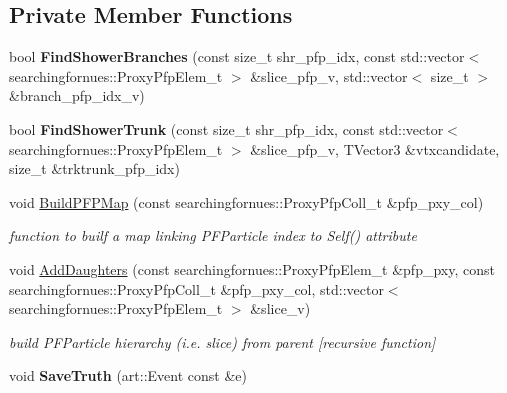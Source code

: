 \subsection*{Private Member Functions}
\begin{DoxyCompactItemize}
\item 
\hypertarget{classShowerMerger_a6fb74d3738dbaf29ebe0257eea8e3c6c}{bool {\bfseries Find\-Shower\-Branches} (const size\-\_\-t shr\-\_\-pfp\-\_\-idx, const std\-::vector$<$ searchingfornues\-::\-Proxy\-Pfp\-Elem\-\_\-t $>$ \&slice\-\_\-pfp\-\_\-v, std\-::vector$<$ size\-\_\-t $>$ \&branch\-\_\-pfp\-\_\-idx\-\_\-v)}\label{classShowerMerger_a6fb74d3738dbaf29ebe0257eea8e3c6c}

\item 
\hypertarget{classShowerMerger_a559f4ef0334813f609ce0038fc5b273c}{bool {\bfseries Find\-Shower\-Trunk} (const size\-\_\-t shr\-\_\-pfp\-\_\-idx, const std\-::vector$<$ searchingfornues\-::\-Proxy\-Pfp\-Elem\-\_\-t $>$ \&slice\-\_\-pfp\-\_\-v, T\-Vector3 \&vtxcandidate, size\-\_\-t \&trktrunk\-\_\-pfp\-\_\-idx)}\label{classShowerMerger_a559f4ef0334813f609ce0038fc5b273c}

\item 
void \hyperlink{classShowerMerger_a9fb233f4aafc287d68e3f80bc5fcf27a}{Build\-P\-F\-P\-Map} (const searchingfornues\-::\-Proxy\-Pfp\-Coll\-\_\-t \&pfp\-\_\-pxy\-\_\-col)
\begin{DoxyCompactList}\small\item\em function to builf a map linking P\-F\-Particle index to Self() attribute \end{DoxyCompactList}\item 
void \hyperlink{classShowerMerger_af7fd315853bd22adcb9a9479706673de}{Add\-Daughters} (const searchingfornues\-::\-Proxy\-Pfp\-Elem\-\_\-t \&pfp\-\_\-pxy, const searchingfornues\-::\-Proxy\-Pfp\-Coll\-\_\-t \&pfp\-\_\-pxy\-\_\-col, std\-::vector$<$ searchingfornues\-::\-Proxy\-Pfp\-Elem\-\_\-t $>$ \&slice\-\_\-v)
\begin{DoxyCompactList}\small\item\em build P\-F\-Particle hierarchy (i.\-e. slice) from parent \mbox{[}recursive function\mbox{]} \end{DoxyCompactList}\item 
\hypertarget{classShowerMerger_a2182bc1472f67f60cd02c7546fb0eabd}{void {\bfseries Save\-Truth} (art\-::\-Event const \&e)}\label{classShowerMerger_a2182bc1472f67f60cd02c7546fb0eabd}

\end{DoxyCompactItemize}
